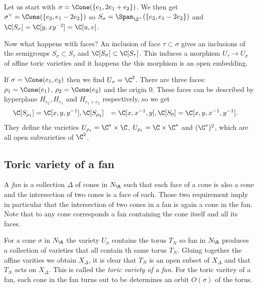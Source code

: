 \documentclass{worksheetclass}
\begin{document}
        \begin{examp*}
            Let us start with $\sigma=\Cone(\{e_1,2e_1+e_2\})$. We then get $\sigma^\vee=\Cone(\{e_2,e_1-2e_2\})$ so $S_\sigma=\Span_{\Z^+}(\{e_2,e_1-2e_2\})$ and $\C[S_\sigma]=\C[y,xy^{-2}]=\C[u,v]$.
        \end{examp*}

        Now what happens with faces? An inclusion of face $\tau\subset\sigma$ gives an inclusions of the semigroups $S_\sigma\subset S_\tau$ and $\C[S_\sigma]\subset \C[S_\tau]$. This induces a morphism $U_\tau\to U_\sigma$ of affine toric varieties and it happens the this morphism is an open embedding.
        \begin{examp*}
            If $\sigma=\Cone(e_1,e_2)$ then we find $U_\sigma=\C^2$. There are three faces: $\rho_1=\Cone(e_1)$, $\rho_2=\Cone(e_2)$ and the origin $0$. These faces can be described by hyperplane $H_{e_2}, H_{e_1}$ and $H_{e_1+e_2}$ respectively, so we get
            \begin{align}
                \C[S_{\rho_1}] &= \C[x,y,y^{-1}],
                \C[S_{\rho_2}] &= \C[x,x^{-1},y],
                \C[S_{0}] &= \C[x,y,x^{-1},y^{-1}].
            \end{align}
            They define the varieties $U_{\rho_1}=\C^*\times\C$, $U_{\rho_1}=\C\times\C^*$ and $(\C^*)^2$, which are all open subvarieties of $\C^2$.
        \end{examp*}

    \subsection{Toric variety of a fan}
        
        A \emph{fan} is a collection $\Delta$ of cones in $N_\R$ such that each face of a cone is also a cone and the intersection of two cones is a face of each. Those two requirement imply in particular that the intersection of two cones in a fan is again a cone in the fan. Note that to any cone corresponds a fan containing the cone itself and all its faces.

        For a cone $\sigma$ in $N_\R$ the variety $U_\sigma$ contains the torus $T_N$ so fan in $N_\R$ produces a collection of varieties that all contain th same torus $T_N$. Gluing together the affine varities we obtain $X_\Delta$, it is clear that $T_N$ is an open subset of $X_\Delta$ and that $T_N$ acts on $X_\Delta$. This is called the \emph{toric variety of a fan}. For the toric varitey of a fan, each cone in the fan turns out to be determines an orbit $O(\sigma)$ of the torus.
\end{document}
